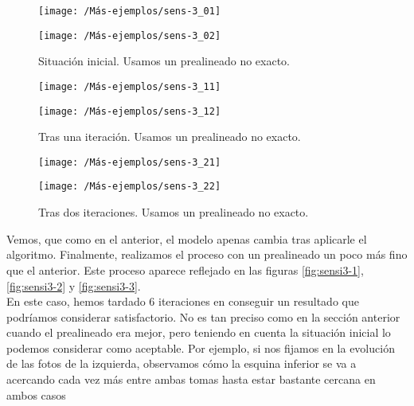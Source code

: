 \begin{figure}[h!]	
	\begin{minipage}[b]{0.5\textwidth}
		\centering		
		\texttt{[image: /Más-ejemplos/sens-3\_01]} 
	\end{minipage}
	\begin{minipage}[b]{0.5\textwidth}
		\centering
		\texttt{[image: /Más-ejemplos/sens-3\_02]}
	\end{minipage}	
	\caption{Situación inicial. Usamos un prealineado no exacto.}
	\label{fig:sensi-2-1}
\end{figure}
\begin{figure}[h!]	
	\begin{minipage}[b]{0.5\textwidth}
		\centering		
		\texttt{[image: /Más-ejemplos/sens-3\_11]} 
	\end{minipage}
	\begin{minipage}[b]{0.5\textwidth}
		\centering
		\texttt{[image: /Más-ejemplos/sens-3\_12]}
	\end{minipage}	
	\caption{Tras una iteración. Usamos un prealineado no exacto.}
	\label{fig:sensi-2-2}
\end{figure}

\begin{figure}[h!]	
	\begin{minipage}[b]{0.5\textwidth}
		\centering		
		\texttt{[image: /Más-ejemplos/sens-3\_21]} 
	\end{minipage}
	\begin{minipage}[b]{0.5\textwidth}
		\texttt{[image: /Más-ejemplos/sens-3\_22]}
	\end{minipage}	
	\caption{Tras dos iteraciones. Usamos un prealineado no exacto.}
	\label{fig:sensi-2-3}
\end{figure}

Vemos, que como en el anterior, el modelo apenas cambia tras aplicarle el algoritmo. Finalmente, realizamos el proceso con un prealineado un poco más fino que el anterior. Este proceso aparece reflejado en las figuras \ref{fig:sensi3-1}, \ref{fig:sensi3-2} y \ref{fig:sensi3-3}.\\

En este caso, hemos tardado 6 iteraciones en conseguir un resultado que podríamos considerar satisfactorio. No es tan preciso como en la sección anterior cuando el prealineado era mejor, pero teniendo en cuenta la situación inicial lo podemos considerar como aceptable. Por ejemplo, si nos fijamos en la evolución de las fotos de la izquierda, observamos cómo la esquina inferior se va a acercando cada vez más entre ambas tomas hasta estar bastante cercana en ambos casos

